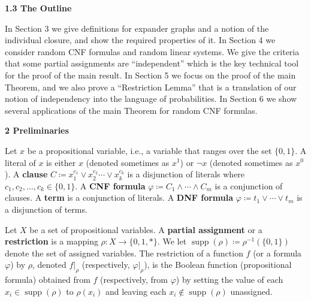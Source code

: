 \documentclass[10pt,a4paper]{article}
\begin{document}
\par\medskip\noindent\textbf{
1.3 The Outline}\par




In Section 3 we give definitions for expander graphs and a notion of the
individual closure, and show the required properties of it. In Section
4 we consider random CNF formulas and random linear systems. We
give the criteria that some partial assignments are “independent” which is the key technical tool for
the proof of the main result. In Section 5 we focus on the proof of the main
Theorem, and we also prove a “Restriction Lemma” that is a translation of our notion of independency
into the language of probabilities. In Section 6 we show several
applications of the main Theorem for random CNF formulas.\par






\par\medskip\noindent\textbf{
2 Preliminaries}\par




Let $x$ be a propositional variable, i.e., a variable that ranges over the set $\{0,1\}$. A literal of
$x$ is either $x$ (denoted sometimes as $x^{1}$) or $\neg x$ (denoted sometimes as $x^{0}$). A
\textbf{clause} $C\coloneqq x_{1}^{c_{1}}\lor x_{2}^{c_{2}}\cdots\lor x_{k}^{c_{k}}$ is a disjunction of
literals where $c_{1},c_{2},\dots,c_{k}\in\{0,1\}$. A \textbf{CNF formula} $\varphi\coloneqq C_{1}\land\cdots\land C_{m}$ is a conjunction of clauses. A \textbf{term} is a conjunction of literals. A
\textbf{DNF formula} $\varphi\coloneqq t_{1}\lor\cdots\lor t_{m}$ is a disjunction of terms.\par




Let $X$ be a set of propositional variables. A \textbf{partial assignment} or a \textbf{restriction} is a
mapping $\rho\colon X\to\{0,1,*\}$. We let $\operatorname*{supp}(\rho)\coloneqq\rho^{-1}(\{0,1\})$
denote the set of assigned variables. The restriction of a function $f$ (or a formula $\varphi$) by
$\rho$, denoted $f|_{\rho}$ (respectively, $\varphi|_{\rho}$), is the Boolean function (propositional
formula) obtained from $f$ (respectively, from $\varphi$) by setting the value of each $x_{i}\in\operatorname*{supp}(\rho)$ to $\rho(x_{i})$ and leaving each $x_{i}\notin\operatorname*{supp}(\rho)$ unassigned.\par
\end{document}
